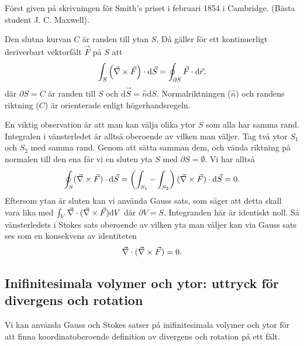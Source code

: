 \documentclass[%
oneside,                 %
final,                   %
10pt]{article}
\newenvironment{summary_mdfboxadmon}[1][]{
\begin{summary_mdfboxmdframed}[frametitle=#1]
}
{
\end{summary_mdfboxmdframed}
}
\begin{document}
Först given på skrivningen för Smith's priset i februari 1854 i Cambridge.  (Bästa student J. C. Maxwell).


\begin{summary_mdfboxadmon}[Sats:]
Den slutna kurvan $C$ är randen till ytan $S$. Då gäller för ett kontinuerligt deriverbart vektorfält $\vec{F}$ på $S$ att
\begin{equation}
  \int_S \left( \vec{\nabla} \times \vec{F}\right) \cdot \mbox{d}\vec{S} = \oint_{\partial S} \vec{F}\cdot
\mbox{d}\vec{r},
\end{equation}
där $\partial S = C$ är randen till $S$ och $\mbox{d}\vec{S} = \hat{n} \mbox{d} S$. Normalriktningen ($\hat{n}$) och randens riktning ($C$) är orienterade enligt högerhandsregeln.
\end{summary_mdfboxadmon} %



En viktig observation är att man kan välja olika ytor $S$ som alla
har samma rand. Integralen i vänsterledet är alltså oberoende
av vilken man väljer. Tag två ytor $S_1$ och $S_2$ med samma
rand. Genom att sätta samman dem, och vända riktning på
normalen till den ena får vi en sluten yta $S$ med
$\partial S=\emptyset$. Vi har alltså 
\begin{equation}
\oint_S(\vec{\nabla}\times\vec{F})\cdot \mbox{d}\vec{S} = \left(\int_{S_1}-\int_{S_2}\right)(\vec{\nabla}\times\vec{F})\cdot
\mbox{d}\vec{S}=0. 
\end{equation}
Eftersom ytan är sluten kan vi använda Gauss sats, som säger att detta skall vara lika med
$\int_V\vec{\nabla}\cdot(\vec{\nabla}\times\vec{F})\mbox{d}V$ där $\partial V=S$. Integranden här är identiskt noll. Så vänsterledets i Stokes sats oberoende av vilken yta man väljer kan via Gauss sats ses som en konsekvens av identiteten 
\begin{equation}
\vec{\nabla}\cdot(\vec{\nabla}\times\vec F)=0.
\end{equation}


\subsection*{Inifinitesimala volymer och ytor: uttryck för divergens och rotation}

Vi kan använda Gauss och Stokes satser på inifinitesimala volymer och ytor för att finna koordinatoberoende definition av divergens och rotation på ett fält.
\end{document}
